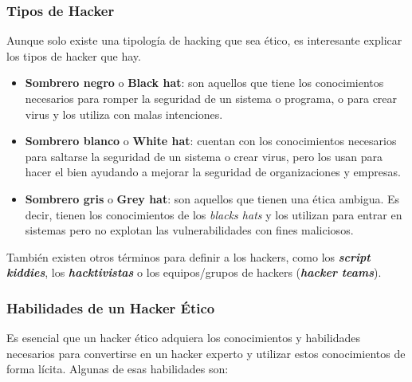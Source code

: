 \subsubsection{Tipos de Hacker}

Aunque solo existe una tipología de hacking que sea ético, es interesante explicar los tipos de hacker que hay.

\begin{itemize}
    \item \textbf{Sombrero negro} o \textbf{Black hat}: son aquellos que tiene los conocimientos necesarios para romper la seguridad de un sistema o programa, o para crear virus y los utiliza con malas intenciones.
    \item \textbf{Sombrero blanco} o \textbf{White hat}: cuentan con los conocimientos necesarios para saltarse la seguridad de un sistema o crear virus, pero los usan para hacer el bien ayudando a mejorar la seguridad de organizaciones y empresas.
    \item \textbf{Sombrero gris} o \textbf{Grey hat}: son aquellos que tienen una ética ambigua. Es decir, tienen los conocimientos de los \textit{blacks hats} y los utilizan para entrar en sistemas pero no explotan las vulnerabilidades con fines maliciosos.
\end{itemize}

También existen otros términos para definir a los hackers, como los \textbf{\textit{script kiddies}}, los \textbf{\textit{hacktivistas}} o los equipos/grupos de hackers (\textbf{\textit{hacker teams}}).

\subsubsection{Habilidades de un Hacker Ético}

Es esencial que un hacker ético adquiera los conocimientos y habilidades necesarios para convertirse en un hacker experto y utilizar estos conocimientos de forma lícita. Algunas de esas habilidades son:


